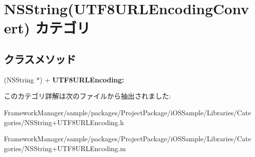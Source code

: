 \hypertarget{category_n_s_string_07_u_t_f8_u_r_l_encoding_convert_08}{}\section{N\+S\+String(U\+T\+F8\+U\+R\+L\+Encoding\+Convert) カテゴリ}
\label{category_n_s_string_07_u_t_f8_u_r_l_encoding_convert_08}
\subsection*{クラスメソッド}
\begin{DoxyCompactItemize}
\item 
\hypertarget{category_n_s_string_07_u_t_f8_u_r_l_encoding_convert_08_a8ea1e0fe1d34b505c3bd66f4c0c6836e}{}(N\+S\+String $\ast$) + {\bfseries U\+T\+F8\+U\+R\+L\+Encoding\+:}\label{category_n_s_string_07_u_t_f8_u_r_l_encoding_convert_08_a8ea1e0fe1d34b505c3bd66f4c0c6836e}

\end{DoxyCompactItemize}


このカテゴリ詳解は次のファイルから抽出されました\+:\begin{DoxyCompactItemize}
\item 
Framework\+Manager/sample/packages/\+Project\+Package/i\+O\+S\+Sample/\+Libraries/\+Categories/N\+S\+String+\+U\+T\+F8\+U\+R\+L\+Encoding.\+h\item 
Framework\+Manager/sample/packages/\+Project\+Package/i\+O\+S\+Sample/\+Libraries/\+Categories/N\+S\+String+\+U\+T\+F8\+U\+R\+L\+Encoding.\+m\end{DoxyCompactItemize}
